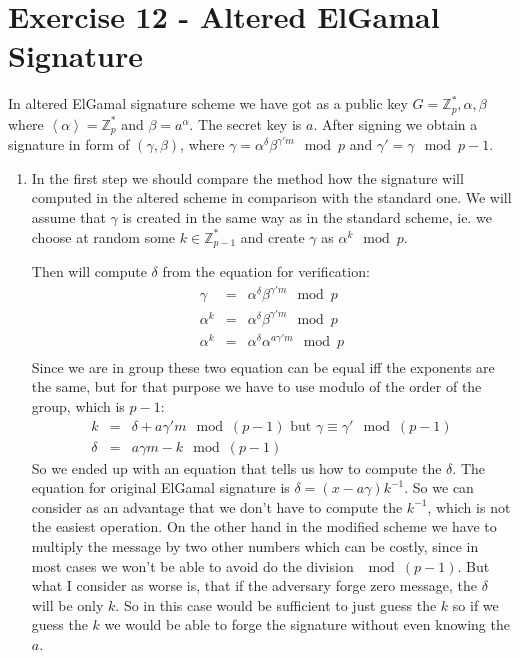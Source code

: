 \documentclass[a4paper,10pt]{article}
\begin{document}
\section*{Exercise 12 - Altered ElGamal Signature}
In altered ElGamal signature scheme we have got as a public key $G=\mathds{Z}^*_p,\alpha,\beta$ where $\left\langle \alpha \right\rangle = \mathds{Z}^*_p$ and $\beta = a^\alpha$. The secret key is $a$. After signing we obtain a signature in form of $(\gamma,\beta)$, where $\gamma = \alpha^\delta\beta^{\gamma' m} \mod p$ and $\gamma' = \gamma \mod p-1$.

\begin{enumerate}[I]
\item In the first step we should compare the method how the signature will computed in the altered scheme in comparison with the standard one. We will assume that $\gamma$ is created in the same way as in the standard scheme, ie. we choose at random some $k \in \mathds{Z}^*_{p-1}$ and create $\gamma$ as $\alpha^k \mod p$.

Then will compute $\delta$ from the equation for verification:
\begin{eqnarray*}
\gamma &=& \alpha^\delta\beta^{\gamma'm} \mod p\\
\alpha^k &=& \alpha^\delta\beta^{\gamma'm} \mod p\\
\alpha^k &=& \alpha^\delta\alpha^{a\gamma'm} \mod p\\
\end{eqnarray*}
Since we are in group these two equation can be equal iff the exponents are the same, but for that purpose we have to use modulo of the order of the group, which is $p-1$:
\begin{eqnarray*}
k &=& \delta + a\gamma'm  \mod (p-1) \text{ but }\gamma\equiv\gamma' \mod (p-1) \\
\delta &=& a\gamma m - k \mod (p-1)
\end{eqnarray*}
So we ended up with an equation that tells us how to compute the $\delta$. The equation for original ElGamal signature is $\delta = (x-a\gamma)k^{-1}$. So we can consider as an advantage that we don't have to compute the $k^{-1}$, which is not the easiest operation. 
On the other hand in the modified scheme we have to multiply the message by two other numbers which can be costly, since in most cases we won't be able to avoid do the division $\mod (p-1)$. But what I consider as worse is, that if the adversary forge zero message, the $\delta$ will be only $k$. So in this case would be sufficient to just guess the $k$ so if we guess the $k$ we would be able to forge the signature without even knowing the $a$.


\end{enumerate}
\end{document}
